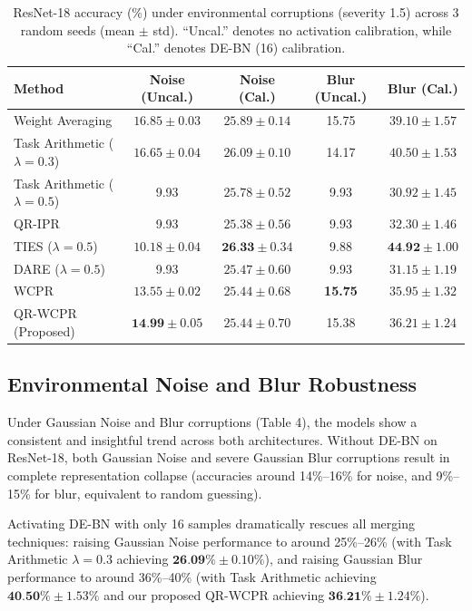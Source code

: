\documentclass{article}
\theoremstyle{plain}
\theoremstyle{definition}
\theoremstyle{remark}
\begin{document}
\begin{table}[t]
\caption{ResNet-18 accuracy (\%) under environmental corruptions (severity 1.5) across 3 random seeds (mean $\pm$ std). ``Uncal.'' denotes no activation calibration, while ``Cal.'' denotes DE-BN (16) calibration.}
\label{tab:corruptions}
\begin{center}
\footnotesize
\setlength{\tabcolsep}{4pt}
\begin{tabular}{lcccc}
\toprule
\textbf{Method} & \textbf{Noise (Uncal.)} & \textbf{Noise (Cal.)} & \textbf{Blur (Uncal.)} & \textbf{Blur (Cal.)} \\
\midrule
Weight Averaging & $16.85 \pm 0.03$ & $25.89 \pm 0.14$ & 15.75 & $39.10 \pm 1.57$ \\
Task Arithmetic ($\lambda=0.3$) & $16.65 \pm 0.04$ & $26.09 \pm 0.10$ & 14.17 & $40.50 \pm 1.53$ \\
Task Arithmetic ($\lambda=0.5$) & 9.93 & $25.78 \pm 0.52$ & 9.93 & $30.92 \pm 1.45$ \\
QR-IPR & 9.93 & $25.38 \pm 0.56$ & 9.93 & $32.30 \pm 1.46$ \\
TIES ($\lambda=0.5$) & $10.18 \pm 0.04$ & $\textbf{26.33} \pm 0.34$ & 9.88 & $\textbf{44.92} \pm 1.00$ \\
DARE ($\lambda=0.5$) & 9.93 & $25.47 \pm 0.60$ & 9.93 & $31.15 \pm 1.19$ \\
WCPR & $13.55 \pm 0.02$ & $25.44 \pm 0.68$ & \textbf{15.75} & $35.95 \pm 1.32$ \\
QR-WCPR (Proposed) & $\textbf{14.99} \pm 0.05$ & $25.44 \pm 0.70$ & 15.38 & $36.21 \pm 1.24$ \\
\bottomrule
\end{tabular}
\end{center}
\end{table}

\subsection{Environmental Noise and Blur Robustness}
Under Gaussian Noise and Blur corruptions (Table 4), the models show a consistent and insightful trend across both architectures. Without DE-BN on ResNet-18, both Gaussian Noise and severe Gaussian Blur corruptions result in complete representation collapse (accuracies around 14\%--16\% for noise, and 9\%--15\% for blur, equivalent to random guessing). 

Activating DE-BN with only 16 samples dramatically rescues all merging techniques: raising Gaussian Noise performance to around 25\%--26\% (with Task Arithmetic $\lambda=0.3$ achieving $\textbf{26.09}\% \pm 0.10\%$), and raising Gaussian Blur performance to around 36\%--40\% (with Task Arithmetic achieving $\textbf{40.50}\% \pm 1.53\%$ and our proposed QR-WCPR achieving $\textbf{36.21}\% \pm 1.24\%$). 
\end{document}
